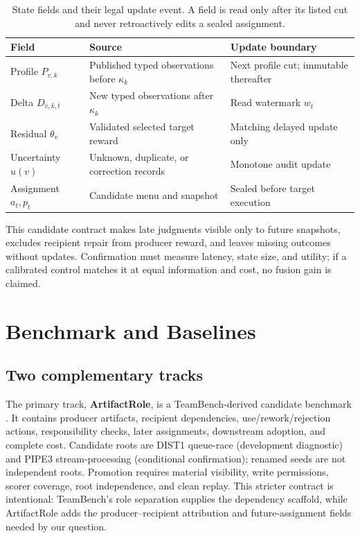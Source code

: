 \documentclass[sigconf,anonymous]{aamas}
\begin{document}
\begin{table}[t]
\centering\scriptsize
\setlength{\tabcolsep}{2pt}
\caption{State fields and their legal update event. A field is read only after its listed cut and never retroactively edits a sealed assignment.}
\label{tab:state-contract}
\begin{tabular}{p{}p{}p{}}
\toprule
Field & Source & Update boundary \\
\midrule
Profile $P_{v,k}$ & Published typed observations before $\kappa_k$ & Next profile cut; immutable thereafter \\
Delta $D_{v,k,t}$ & New typed observations after $\kappa_k$ & Read watermark $w_t$ \\
Residual $\theta_v$ & Validated selected target reward & Matching delayed update only \\
Uncertainty $u(v)$ & Unknown, duplicate, or correction records & Monotone audit update \\
Assignment $a_t,p_t$ & Candidate menu and snapshot & Sealed before target execution \\
\bottomrule
\end{tabular}
\end{table}

This candidate contract makes late judgments visible only to future snapshots, excludes recipient repair from producer reward, and leaves missing outcomes without updates. Confirmation must measure latency, state size, and utility; if a calibrated control matches it at equal information and cost, no fusion gain is claimed.

\section{Benchmark and Baselines}
\label{sec:benchmark}

\subsection{Two complementary tracks}
The primary track, \textbf{ArtifactRole}, is a TeamBench-derived candidate benchmark \cite{kim2026teambench}. It contains producer artifacts, recipient dependencies, use/rework/rejection actions, responsibility checks, later assignments, downstream adoption, and complete cost. Candidate roots are DIST1 queue-race (development diagnostic) and PIPE3 stream-processing (conditional confirmation); renamed seeds are not independent roots. Promotion requires material visibility, write permissions, scorer coverage, root independence, and clean replay. This stricter contract is intentional: TeamBench's role separation supplies the dependency scaffold, while ArtifactRole adds the producer--recipient attribution and future-assignment fields needed by our question.
\end{document}
